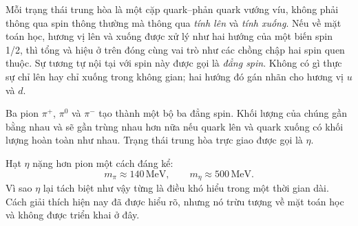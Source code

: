 Mỗi trạng thái trung hòa là một cặp quark--phản quark vướng víu, không phải thông qua spin thông thường mà thông qua \emph{tính lên} và \emph{tính xuống}. Nếu về mặt toán học, hương vị lên và xuống được xử lý như hai hướng của một biến spin 1/2, thì tổng và hiệu ở trên đóng cùng vai trò như các chồng chập hai spin quen thuộc. Sự tương tự nội tại với spin này được gọi là \emph{đẳng spin}. Không có gì thực sự chỉ lên hay chỉ xuống trong không gian; hai hướng đó gán nhãn cho hương vị \(u\) và \(d\).

Ba pion \(\pi^+\), \(\pi^0\) và \(\pi^-\) tạo thành một bộ ba đẳng spin. Khối lượng của chúng gần bằng nhau và sẽ gần trùng nhau hơn nữa nếu quark lên và quark xuống có khối lượng hoàn toàn như nhau. Trạng thái trung hòa trực giao được gọi là \(\eta\).

Hạt \(\eta\) nặng hơn pion một cách đáng kể:
\begin{equation}
m_\pi \approx 140\,\mathrm{MeV},
\qquad
m_\eta \approx 500\,\mathrm{MeV}.
\end{equation}
Vì sao \(\eta\) lại tách biệt như vậy từng là điều khó hiểu trong một thời gian dài. Cách giải thích hiện nay đã được hiểu rõ, nhưng nó trừu tượng về mặt toán học và không được triển khai ở đây.

\begin{classroomqa}
\end{classroomqa}

\begin{classroomqa}
\end{classroomqa}

\begin{classroomqa}
\end{classroomqa}

